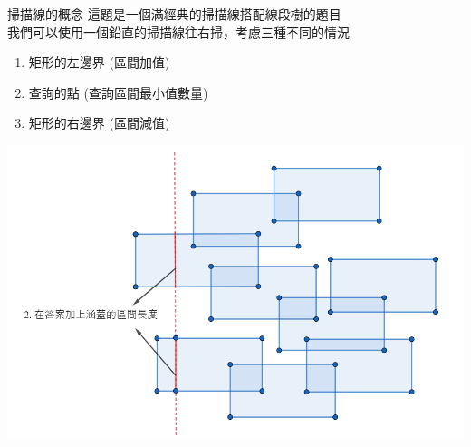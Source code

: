\documentclass[aspectratio=169]{beamer}
\begin{document}
\begin{frame}{掃描線的概念}
    這題是一個滿經典的掃描線搭配線段樹的題目 \\
    \vspace{2.5mm}
    我們可以使用一個鉛直的掃描線往右掃，考慮三種不同的情況 \\
    \begin{enumerate}
        \item 矩形的左邊界 (區間加值)
        \item 查詢的點 (查詢區間最小值數量)
        \item 矩形的右邊界 (區間減值)
    \end{enumerate}
    \begin{center}
        \includegraphics[scale=0.25]{images/rectangle_area_3.png}
    \end{center}
\end{frame}
\end{document}
